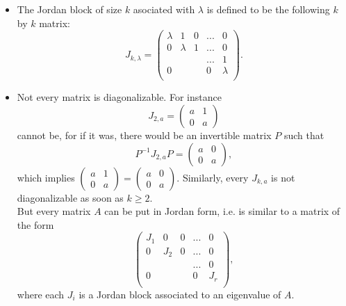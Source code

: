 \begin{itemize}
\item The Jordan block of size $k$ asociated with $\lambda$ is defined to be the following $k$ by $k$ matrix:
\[J_{k,\lambda}=\begin{pmatrix}
\lambda &  1 & 0 & ... & 0 \\
0 & \lambda & 1 & ... & 0  \\
  &   &         &  ...   &  1 \\
0 &   &         &  0   & \lambda \\
\end{pmatrix}.\]

\item Not every matrix is diagonalizable. For instance
\[J_{2,a} = \begin{pmatrix} a & 1 \\ 0 & a \end{pmatrix}\]
cannot be, for if it was, there would be an invertible matrix $P$ such that
\[P^{-1}J_{2,a} P =  \begin{pmatrix} a & 0 \\ 0 & a \end{pmatrix}, \]
which implies $\begin{pmatrix} a & 1 \\ 0 & a \end{pmatrix}=\begin{pmatrix} a & 0 \\ 0 & a \end{pmatrix}$. Similarly, every $J_{k,a}$ is not diagonalizable as soon as $k\geq 2$.\\

But every matrix $A$ can be put in Jordan form, i.e. is similar to a matrix of the form
\[\begin{pmatrix}
J_1 & 0 & 0 & ... & 0 \\
0 & J_2 & 0 & ... & 0  \\
  &   &         &  ...   &  0 \\
0 &   &         &  0   & J_r \\
\end{pmatrix},\]
where each $J_i$ is a Jordan block associated to an eigenvalue of $A$.


\end{itemize}
